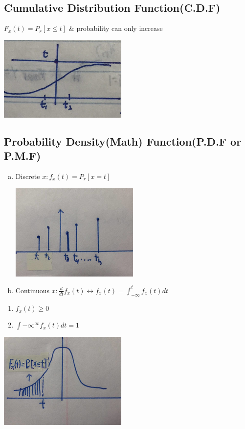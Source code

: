 \documentclass{article}
\begin{document}
\subsection{Cumulative Distribution Function(C.D.F)}
	$ F_x(t)= P_r[x\le t]$ \& probability can only increase

\begin{center}{
\includegraphics{cdf.png}
}
\end{center}  	
            
\subsection{Probability Density(Math) Function(P.D.F or P.M.F)}
	\begin{enumerate}[a)]
	\item Discrete $ x: f_x(t)= P_r[x= t]$

\begin{center}{
\includegraphics{discretepdf.png}
}
\end{center}
 
	  
	\item Continuous $ x: \frac{d}{dt}f_x(t)\leftrightarrow f_x(t)=\int_{-\infty}^{t}f_x(t)dt$
	\end{enumerate}
		\begin{enumerate}[i]
		\item $f_x(t)\ge 0$
		\item $\int{-\infty}^{\infty}f_x(t)dt= 1$
		\end{enumerate}
		
\begin{center}{
\includegraphics{continupdf.png}
}
\end{center}		
\end{document}
